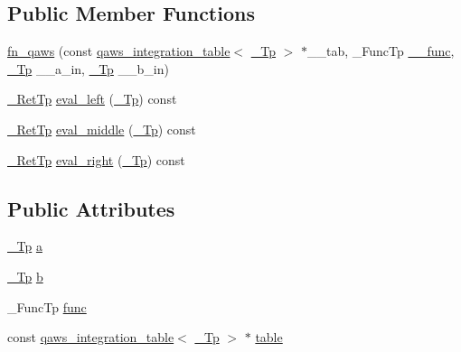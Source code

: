 \subsection*{Public Member Functions}
\begin{DoxyCompactItemize}
\item 
\hyperlink{struct____gnu__cxx_1_1fn__qaws_a5e73b46a15a77c92f516c0ebad8a836a}{fn\+\_\+qaws} (const \hyperlink{struct____gnu__cxx_1_1qaws__integration__table}{qaws\+\_\+integration\+\_\+table}$<$ \hyperlink{namespace____gnu__cxx_a3b19a9c800ca194374ef9172290f7d79}{\+\_\+\+Tp} $>$ $\ast$\+\_\+\+\_\+tab, \+\_\+\+Func\+Tp \hyperlink{namespace____gnu__cxx_af2b2f0c7a2ae72b922b1afefae5a65b2}{\+\_\+\+\_\+func}, \hyperlink{namespace____gnu__cxx_a3b19a9c800ca194374ef9172290f7d79}{\+\_\+\+Tp} \+\_\+\+\_\+a\+\_\+in, \hyperlink{namespace____gnu__cxx_a3b19a9c800ca194374ef9172290f7d79}{\+\_\+\+Tp} \+\_\+\+\_\+b\+\_\+in)
\item 
\hyperlink{struct____gnu__cxx_1_1fn__qaws_afb28f16c42d0f494bfe2d48e2524a5b1}{\+\_\+\+Ret\+Tp} \hyperlink{struct____gnu__cxx_1_1fn__qaws_afbe290f928e148bc754398a79932386c}{eval\+\_\+left} (\hyperlink{namespace____gnu__cxx_a3b19a9c800ca194374ef9172290f7d79}{\+\_\+\+Tp}) const
\item 
\hyperlink{struct____gnu__cxx_1_1fn__qaws_afb28f16c42d0f494bfe2d48e2524a5b1}{\+\_\+\+Ret\+Tp} \hyperlink{struct____gnu__cxx_1_1fn__qaws_af2df56d9df764744fd045d26b5ef1c95}{eval\+\_\+middle} (\hyperlink{namespace____gnu__cxx_a3b19a9c800ca194374ef9172290f7d79}{\+\_\+\+Tp}) const
\item 
\hyperlink{struct____gnu__cxx_1_1fn__qaws_afb28f16c42d0f494bfe2d48e2524a5b1}{\+\_\+\+Ret\+Tp} \hyperlink{struct____gnu__cxx_1_1fn__qaws_aaace385375d3e3f74072901ea44f4b01}{eval\+\_\+right} (\hyperlink{namespace____gnu__cxx_a3b19a9c800ca194374ef9172290f7d79}{\+\_\+\+Tp}) const
\end{DoxyCompactItemize}
\subsection*{Public Attributes}
\begin{DoxyCompactItemize}
\item 
\hyperlink{namespace____gnu__cxx_a3b19a9c800ca194374ef9172290f7d79}{\+\_\+\+Tp} \hyperlink{struct____gnu__cxx_1_1fn__qaws_afe83dc1c94299aedf4cb7be0499fe572}{a}
\item 
\hyperlink{namespace____gnu__cxx_a3b19a9c800ca194374ef9172290f7d79}{\+\_\+\+Tp} \hyperlink{struct____gnu__cxx_1_1fn__qaws_a35f509512c31f2ee8fddc16405dc6e80}{b}
\item 
\+\_\+\+Func\+Tp \hyperlink{struct____gnu__cxx_1_1fn__qaws_a0fe42f7ea452aae136c5dba3264c3e93}{func}
\item 
const \hyperlink{struct____gnu__cxx_1_1qaws__integration__table}{qaws\+\_\+integration\+\_\+table}$<$ \hyperlink{namespace____gnu__cxx_a3b19a9c800ca194374ef9172290f7d79}{\+\_\+\+Tp} $>$ $\ast$ \hyperlink{struct____gnu__cxx_1_1fn__qaws_a8a96359bac745cd83938fc0735a9168d}{table}
\end{DoxyCompactItemize}


